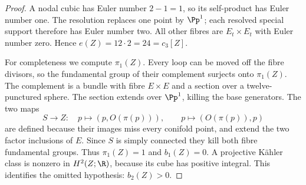 \begin{proof}
A nodal cubic has Euler number $2-1=1$, so its self-product has
Euler number one. The resolution replaces one point by $\Pp^1$;
each resolved special support therefore has Euler number two.
All other fibres are $E_t\times E_t$ with Euler number zero.
Hence $e(Z)=12\cdot2=24=c_3[Z]$.

For completeness we compute $\pi_1(Z)$. Every loop can be moved
off the fibre divisors, so the fundamental group of their complement
surjects onto $\pi_1(Z)$. The complement is a bundle with fibre
$E\times E$ and a section over a twelve-punctured sphere. The
section extends over $\Pp^1$, killing the base generators. The
two maps
\[
 S\longrightarrow Z:\quad p\mapsto(p,O(\pi(p))),\qquad
 p\mapsto(O(\pi(p)),p)
\]
are defined because their images miss every conifold point, and
extend the two factor inclusions of $E$. Since $S$ is simply
connected they kill both fibre fundamental groups. Thus
$\pi_1(Z)=1$ and $b_1(Z)=0$. A projective Kähler class is nonzero
in $H^2(Z;\R)$, because its cube has positive integral. This
identifies the omitted hypothesis: $b_2(Z)>0$.
\end{proof}

